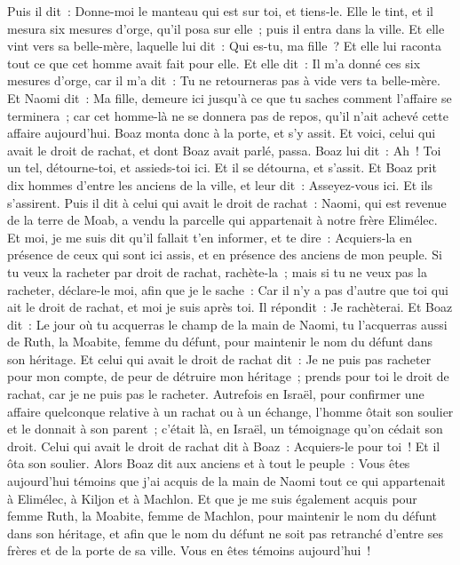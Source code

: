 \begin{multicols}{2}
Puis il dit~: Donne-moi le manteau qui est sur toi, et tiens-le. Elle le tint, et il mesura six mesures d'orge, qu'il posa sur elle~; puis il entra dans la ville.
Et elle vint vers sa belle-mère, laquelle lui dit~: Qui es-tu, ma fille~? Et elle lui raconta tout ce que cet homme avait fait pour elle.
Et elle dit~: Il m'a donné ces six mesures d'orge, car il m'a dit~: Tu ne retourneras pas à vide vers ta belle-mère.
Et Naomi dit~: Ma fille, demeure ici jusqu'à ce que tu saches comment l'affaire se terminera~; car cet homme-là ne se donnera pas de repos, qu'il n'ait achevé cette affaire aujourd'hui.
\VerseOne{}Boaz monta donc à la porte, et s'y assit. Et voici, celui qui avait le droit de rachat, et dont Boaz avait parlé, passa. Boaz lui dit~: Ah~! Toi un tel, détourne-toi, et assieds-toi ici. Et il se détourna, et s'assit.
Et Boaz prit dix hommes d'entre les anciens de la ville, et leur dit~: Asseyez-vous ici. Et ils s'assirent.
Puis il dit à celui qui avait le droit de rachat~: Naomi, qui est revenue de la terre de Moab, a vendu la parcelle qui appartenait à notre frère Elimélec.
Et moi, je me suis dit qu'il fallait t'en informer, et te dire~: Acquiers-la en présence de ceux qui sont ici assis, et en présence des anciens de mon peuple. Si tu veux la racheter par droit de rachat, rachète-la~; mais si tu ne veux pas la racheter, déclare-le moi, afin que je le sache~: Car il n'y a pas d'autre que toi qui ait le droit de rachat, et moi je suis après toi. Il répondit~: Je rachèterai.
Et Boaz dit~: Le jour où tu acquerras le champ de la main de Naomi, tu l'acquerras aussi de Ruth, la Moabite, femme du défunt, pour maintenir le nom du défunt dans son héritage.
Et celui qui avait le droit de rachat dit~: Je ne puis pas racheter pour mon compte, de peur de détruire mon héritage~; prends pour toi le droit de rachat, car je ne puis pas le racheter.
Autrefois en Israël, pour confirmer une affaire quelconque relative à un rachat ou à un échange, l'homme ôtait son soulier et le donnait à son parent~; c'était là, en Israël, un témoignage qu'on cédait son droit.
Celui qui avait le droit de rachat dit à Boaz~: Acquiers-le pour toi~! Et il ôta son soulier.
Alors Boaz dit aux anciens et à tout le peuple~: Vous êtes aujourd'hui témoins que j'ai acquis de la main de Naomi tout ce qui appartenait à Elimélec, à Kiljon et à Machlon.
Et que je me suis également acquis pour femme Ruth, la Moabite, femme de Machlon, pour maintenir le nom du défunt dans son héritage, et afin que le nom du défunt ne soit pas retranché d'entre ses frères et de la porte de sa ville. Vous en êtes témoins aujourd'hui~!

\end{multicols}
